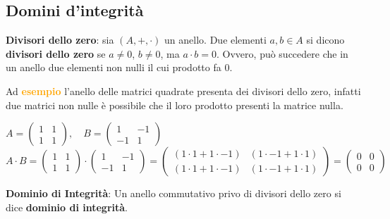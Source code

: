 \subsection{Domini d'integrità}
\textbf{Divisori dello zero}: sia $(A, +, \cdot)$ un anello. Due elementi $a,b \in A$ si dicono \textbf{divisori dello zero} se $a \neq 0$, $b \neq 0$, ma $a \cdot b = 0$. Ovvero, può succedere che in un anello due elementi non nulli il cui prodotto fa 0.
\begin{boxA}
    Ad \textcolor{orange}{\textbf{esempio}} l'anello delle matrici quadrate presenta dei divisori dello zero, infatti due matrici non nulle è possibile che il loro prodotto presenti la matrice nulla.
    \begin{center}
        \begin{math}
            A = \begin{pmatrix}
                1 & 1 \\
                1 & 1
                \end{pmatrix}, \quad B = \begin{pmatrix}
                1 & -1 \\
                -1 & 1
                \end{pmatrix}
        \end{math}
        \begin{math}
            A \cdot B = \begin{pmatrix}
                1 & 1 \\
                1 & 1
                \end{pmatrix} \cdot \begin{pmatrix}
                1 & -1 \\
                -1 & 1
                \end{pmatrix} = \begin{pmatrix}
                (1 \cdot 1 + 1 \cdot -1) & (1 \cdot -1 + 1 \cdot 1) \\
                (1 \cdot 1 + 1 \cdot -1) & (1 \cdot -1 + 1 \cdot 1)
                \end{pmatrix} = \begin{pmatrix}
                0 & 0 \\
                0 & 0
                \end{pmatrix}
        \end{math}
    \end{center}    
\end{boxA}
\textbf{Dominio di Integrità}: Un anello commutativo privo di divisori dello zero si dice \textbf{dominio di integrità}.

